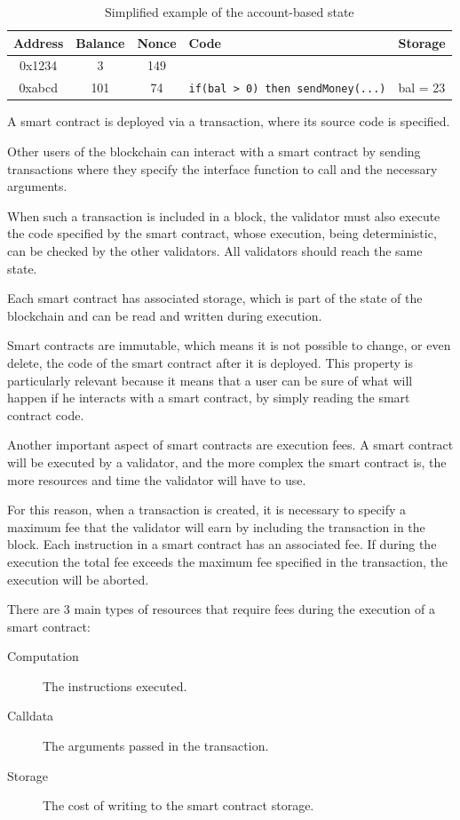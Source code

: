 \documentclass[12pt]{article}
\begin{document}
\begin{table}[h]
    \centering
    \begin{tabular}{|c|c|c|l|l|}
        \hline
        \textbf{Address} & \textbf{Balance} & \textbf{Nonce} & \textbf{Code} & \textbf{Storage} \\
        \hline
        0x1234 & 3 & 149 & & \\        
        0xabcd & 101 & 74 & \verb|if(bal > 0) then sendMoney(...)| & bal = 23 \\
        \hline       
    \end{tabular}
    \caption{Simplified example of the account-based state}
    \label{table:account_based_state}
\end{table}

A smart contract is deployed via a transaction, where its source code is specified.

Other users of the blockchain can interact with a smart contract by sending transactions where they specify the interface function to call and the necessary arguments.

When such a transaction is included in a block, the validator must also execute the code specified by the smart contract, whose execution, being deterministic, can be checked by the other validators. All validators should reach the same state.

Each smart contract has associated storage, which is part of the state of the blockchain and can be read and written during execution.

Smart contracts are immutable, which means it is not possible to change, or even delete, the code of the smart contract after it is deployed. 
This property is particularly relevant because it means that a user can be sure of what will happen if he interacts with a smart contract, by simply reading the smart contract code.

Another important aspect of smart contracts are execution fees. A smart contract will be executed by a validator, and the more complex the smart contract is, the more resources and time the validator will have to use.

For this reason, when a transaction is created, it is necessary to specify a maximum fee that the validator will earn by including the transaction in the block.
Each instruction in a smart contract has an associated fee. If during the execution the total fee exceeds the maximum fee specified in the transaction, the execution will be aborted.

There are 3 main types of resources that require fees during the execution of a smart contract:
\begin{description}
    \item[Computation] The instructions executed.
    \item[Calldata] The arguments passed in the transaction.
    \item[Storage] The cost of writing to the smart contract storage.  
\end{description}
\end{document}
